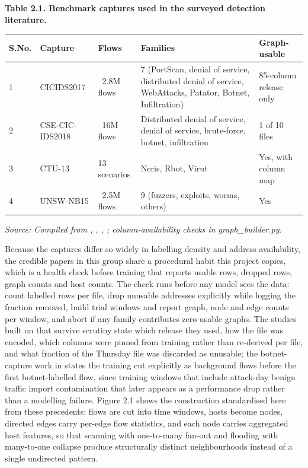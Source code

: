 \begin{center}\textbf{Table 2.1. Benchmark captures used in the surveyed detection literature.}\end{center}

\begin{center}
\begin{tabular}{lllll}
\toprule

S.No. & Capture & Flows & Families & Graph-usable \\

\midrule

1 & CICIDS2017 \cite{k5} & ~2.8M flows & 7 (PortScan, denial of service, distributed denial of service, WebAttacks, Patator, Botnet, Infiltration) & 85-column release only \\

2 & CSE-CIC-IDS2018 \cite{k6} & ~16M flows & Distributed denial of service, denial of service, brute-force, botnet, infiltration & 1 of 10 files \\

3 & CTU-13 \cite{k7} & 13 scenarios & Neris, Rbot, Virut & Yes, with column map \\

4 & UNSW-NB15 \cite{k8} & ~2.5M flows & 9 (fuzzers, exploits, worms, others) & Yes \\

\bottomrule
\end{tabular}
\end{center}

{\small\textit{Source: Compiled from \cite{k5}, \cite{k6}, \cite{k7}, \cite{k8}; column-availability checks in graph\_builder.py.}}

Because the captures differ so widely in labelling density and address availability, the credible papers in this group share a procedural habit this project copies, which is a health check before training that reports usable rows, dropped rows, graph counts and host counts. The check runs before any model sees the data: count labelled rows per file, drop unusable addresses explicitly while logging the fraction removed, build trial windows and report graph, node and edge counts per window, and abort if any family contributes zero usable graphs. The studies built on \cite{k5} that survive scrutiny state which release they used, how the file was encoded, which columns were pinned from training rather than re-derived per file, and what fraction of the Thursday file was discarded as unusable; the botnet-capture work in \cite{k7} states the training cut explicitly as background flows before the first botnet-labelled flow, since training windows that include attack-day benign traffic import contamination that later appears as a performance drop rather than a modelling failure. Figure 2.1 shows the construction standardised here from these precedents: flows are cut into time windows, hosts become nodes, directed edges carry per-edge flow statistics, and each node carries aggregated host features, so that scanning with one-to-many fan-out and flooding with many-to-one collapse produce structurally distinct neighbourhoods instead of a single undirected pattern.

